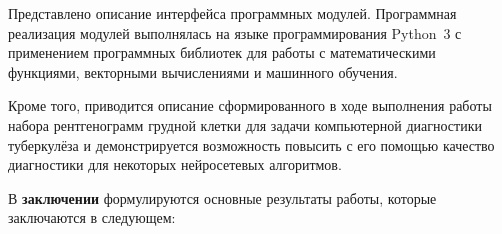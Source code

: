 Представлено описание интерфейса программных модулей. Программная реализация модулей выполнялась на языке программирования Python~3 с применением программных библиотек для работы с математическими функциями, векторными вычислениями и машинного обучения.

Кроме того, приводится описание сформированного в ходе выполнения работы набора рентгенограмм грудной клетки для задачи компьютерной диагностики туберкулёза и демонстрируется возможность повысить с его помощью качество диагностики для некоторых нейросетевых алгоритмов.


\FloatBarrier
{}                                  %
В \textbf{заключении} формулируются основные результаты работы, которые заключаются в следующем:



